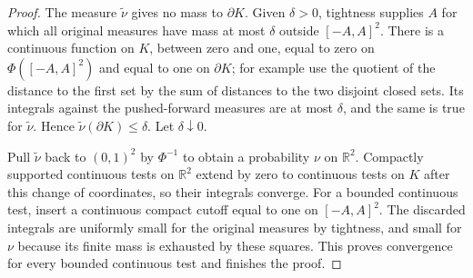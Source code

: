 \documentclass[11pt]{amsart}
\newcommand{\R}{\mathbb R}
\theoremstyle{definition}
\theoremstyle{remark}
\numberwithin{equation}{section}
\begin{document}
\begin{proof}
The measure $\widetilde\nu$ gives no mass to $\partial K$.
Given $\delta>0$, tightness supplies $A$ for which all original
measures have mass at most $\delta$ outside $[-A,A]^2$.
There is a continuous function on $K$, between zero and one,
equal to zero on $\Phi([-A,A]^2)$ and equal to one on
$\partial K$; for example use the quotient of the distance
to the first set by the sum of distances to the two disjoint
closed sets.  Its integrals against the pushed-forward
measures are at most $\delta$, and the same is true for
$\widetilde\nu$.  Hence $\widetilde\nu(\partial K)\le\delta$.
Let $\delta\downarrow0$.

Pull $\widetilde\nu$ back to $(0,1)^2$ by $\Phi^{-1}$ to
obtain a probability $\nu$ on $\R^2$.  Compactly supported
continuous tests on $\R^2$ extend by zero to continuous
tests on $K$ after this change of coordinates, so their
integrals converge.  For a bounded continuous test, insert
a continuous compact cutoff equal to one on $[-A,A]^2$.
The discarded integrals are uniformly small for the original
measures by tightness, and small for $\nu$ because its finite
mass is exhausted by these squares.  This proves convergence
for every bounded continuous test and finishes the proof.
\end{proof}
\end{document}
